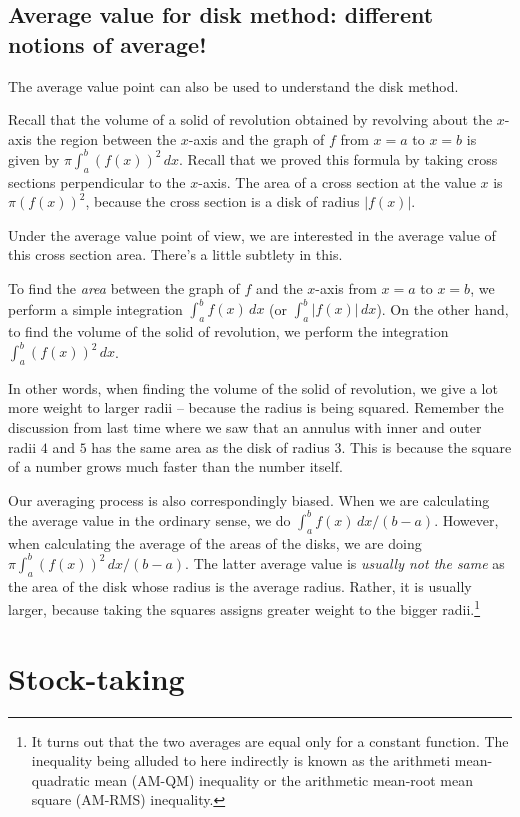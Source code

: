\documentclass[10pt]{amsart}
\begin{document}
\subsection{Average value for disk method: different notions of average!}

The average value point can also be used to understand the disk method.

Recall that the volume of a solid of revolution obtained by revolving
about the $x$-axis the region between the $x$-axis and the graph of
$f$ from $x = a$ to $x = b$ is given by $\pi \int_a^b (f(x))^2 \,
dx$. Recall that we proved this formula by taking cross sections
perpendicular to the $x$-axis. The area of a cross section at the
value $x$ is $\pi(f(x))^2$, because the cross section is a disk of
radius $|f(x)|$.

Under the average value point of view, we are interested in the
average value of this cross section area. There's a little subtlety in
this.

To find the {\em area} between the graph of $f$ and the $x$-axis from
$x = a$ to $x = b$, we perform a simple integration $\int_a^b f(x) \,
dx$ (or $\int_a^b |f(x)| \, dx$). On the other hand, to find the
volume of the solid of revolution, we perform the integration
$\int_a^b (f(x))^2 \, dx$.

In other words, when finding the volume of the solid of revolution, we
give a lot more weight to larger radii -- because the radius is being
squared. Remember the discussion from last time where we saw that an
annulus with inner and outer radii $4$ and $5$ has the same area as
the disk of radius $3$. This is because the square of a number grows
much faster than the number itself.

Our averaging process is also correspondingly biased. When we are
calculating the average value in the ordinary sense, we do $\int_a^b
f(x) \, dx /(b - a)$. However, when calculating the average of the
areas of the disks, we are doing $\pi \int_a^b (f(x))^2 \, dx/(b -
a)$. The latter average value is {\em usually not the same} as the
area of the disk whose radius is the average radius. Rather, it is
usually larger, because taking the squares assigns greater weight to
the bigger radii.\footnote{It turns out that the two averages are
equal only for a constant function. The inequality being alluded to
here indirectly is known as the arithmeti mean-quadratic mean (AM-QM)
inequality or the arithmetic mean-root mean square (AM-RMS)
inequality.}

\section{Stock-taking}
\end{document}
